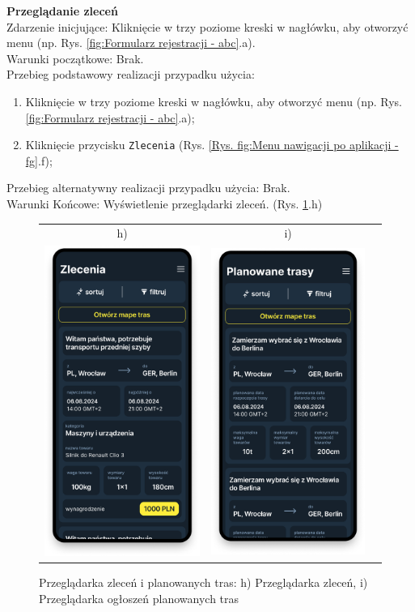 \textbf{Przeglądanie zleceń} \\
Zdarzenie inicjujące: Kliknięcie w trzy poziome kreski w nagłówku, aby otworzyć menu (np. Rys. \ref{fig:Formularz rejestracji - abc}.a). \\
Warunki początkowe: Brak. \\
Przebieg podstawowy realizacji przypadku użycia:
\begin{enumerate}
    \item Kliknięcie w trzy poziome kreski w nagłówku, aby otworzyć menu (np. Rys. \ref{fig:Formularz rejestracji - abc}.a);
    \item Kliknięcie przycisku \texttt{Zlecenia} (Rys. \ref{Rys. fig:Menu nawigacji po aplikacji - fg}.f);
\end{enumerate}
Przebieg alternatywny realizacji przypadku użycia: Brak. \\
Warunki Końcowe: Wyświetlenie przeglądarki zleceń. (Rys. \ref{Rys. fig:Przeglądarka zleceń i planowanych tras - hi}.h)
\begin{figure}[H]
	\centering
	\begin{tabular}{@{}ccc@{}}
            h) & i)\\
    \includegraphics[width=0.3\linewidth]{rozdzial1/zlecenia.png} &
    \includegraphics[width=0.3\linewidth]{rozdzial1/planowane_trasy.png}
    \end{tabular}
    \caption{Przeglądarka zleceń i planowanych tras: h) Przeglądarka zleceń, i) Przeglądarka ogłoszeń planowanych tras}
	\label{Rys. fig:Przeglądarka zleceń i planowanych tras - hi}
\end{figure}
\label{Przeglądanie ogłoszeń planowanych tras}

